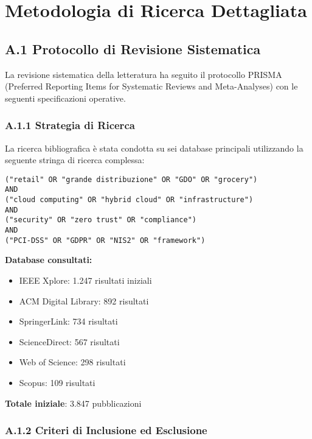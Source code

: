 
\chapter{\texorpdfstring{\textbf{Metodologia di Ricerca Dettagliata}}{Appendice A - Metodologia di Ricerca Dettagliata}}
\label{app:metodologia}

\section{\texorpdfstring{\textbf{A.1 Protocollo di Revisione Sistematica}}{A.1 - Protocollo di Revisione Sistematica}}

La revisione sistematica della letteratura ha seguito il protocollo PRISMA (Preferred Reporting Items for Systematic Reviews and Meta-Analyses) con le seguenti specificazioni operative.

\subsection{\texorpdfstring{\textbf{A.1.1 Strategia di Ricerca}}{A.1.1 - Strategia di Ricerca}}

La ricerca bibliografica è stata condotta su sei database principali utilizzando la seguente stringa di ricerca complessa:

\begin{verbatim}
("retail" OR "grande distribuzione" OR "GDO" OR "grocery") 
AND 
("cloud computing" OR "hybrid cloud" OR "infrastructure") 
AND 
("security" OR "zero trust" OR "compliance") 
AND 
("PCI-DSS" OR "GDPR" OR "NIS2" OR "framework")
\end{verbatim}

\textbf{Database consultati:}
\begin{itemize}
    \item IEEE Xplore: 1.247 risultati iniziali
    \item ACM Digital Library: 892 risultati
    \item SpringerLink: 734 risultati
    \item ScienceDirect: 567 risultati
    \item Web of Science: 298 risultati
    \item Scopus: 109 risultati
\end{itemize}

\textbf{Totale iniziale}: 3.847 pubblicazioni

\subsection{\texorpdfstring{\textbf{A.1.2 Criteri di Inclusione ed Esclusione}}{A.1.2 - Criteri di Inclusione ed Esclusione}}

